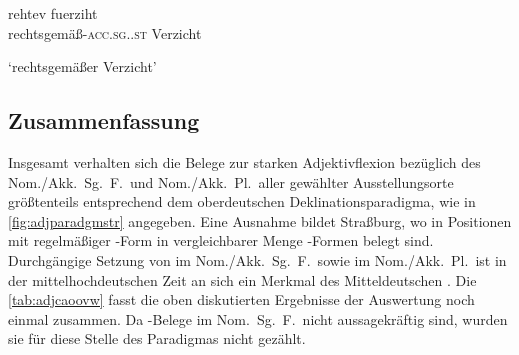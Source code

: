 \begin{exe}
\ex \label{ex:adjwienakksgf_4}
	\gll rehtev	fuerziht \\
		rechtsgemäß-\textsc{acc.sg.\FemI.st} Verzicht \\
	\begin{taggedline}{\parencites(Wien, 1296)[\pno~2424, 500.7]{cao3}}
	\trans `rechtsgemäßer Verzicht'
	\end{taggedline}
\end{exe}

\subsection{Zusammenfassung}

Insgesamt verhalten sich die Belege zur starken Adjektivflexion bezüglich des
Nom./\allowbreak{}Akk.\ Sg.~F.\ und Nom./Akk.\ Pl.\ aller gewählter
Ausstellungs\-orte größtenteils entsprechend dem oberdeutschen
Deklinationsparadigma, wie in \cref{fig:adjparadgmstr} angegeben. Eine Ausnahme
bildet Straßburg, wo in Positionen mit regelmäßiger -Form in
vergleichbarer Menge -Formen belegt sind. Durchgängige Setzung von
 im Nom./Akk.\ Sg.~F.\ sowie im Nom./Akk.\ Pl.\ ist in der
mittelhochdeutschen Zeit an sich ein Merkmal des Mitteldeutschen
\autocites[181]{ksw2}[vgl.~auch][832]{wiesinger1983}. Die
\cref{tab:adjcaoovw} fasst die oben diskutierten Ergebnisse der Auswertung noch
einmal zusammen. Da -Belege im Nom.\ Sg.~F.\ nicht aussagekräftig
sind, wurden sie für diese Stelle des Paradigmas nicht gezählt.

